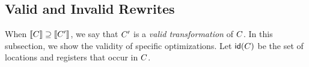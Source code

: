 

\subsection{Valid and Invalid Rewrites}
\label{sec:valid}

When $\llbracket C\rrbracket \supseteq \llbracket C'\rrbracket$, we say that $C'$ is a
\emph{valid transformation} of $C$.  In this subsection, we show the
validity of specific optimizations.  
Let $\mathsf{id}(C)$ be the set of locations and registers that occur in $C$.

